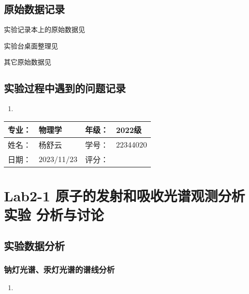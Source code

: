 \documentclass[dvipsnames, svgnames,a4paper,11pt]{article}
\begin{document}
	
	\clearpage
	\subsection{原始数据记录}
	实验记录本上的原始数据见%
	
	实验台桌面整理见%
	
	其它原始数据见%
	
	\subsection{实验过程中遇到的问题记录}
	\begin{enumerate}
		\item 
	\end{enumerate}
	
	
	
	\clearpage
	
	\begin{table}
		\renewcommand\arraystretch{1.7}
		\begin{tabularx}{\textwidth}{|X|X|X|X|}
			\hline
			专业：& 物理学 &年级：& 2022级\\
			\hline
			姓名： & 杨舒云 & 学号：& 22344020\\
			\hline
			日期：& 2023/11/23 & 评分： &\\
			\hline
		\end{tabularx}
	\end{table}
	
	\section{Lab2-1 原子的发射和吸收光谱观测分析实验 \quad\heiti 分析与讨论}
	
	\subsection{实验数据分析}
	
	\subsubsection{钠灯光谱、汞灯光谱的谱线分析}
	\begin{enumerate}
		\item 
	\end{enumerate}
	
\end{document}
